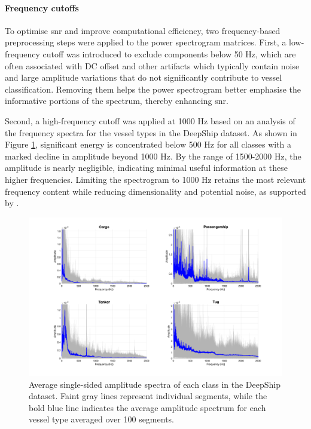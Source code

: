 \paragraph{Frequency cutoffs}
To optimise \acrshort{snr} and improve computational efficiency, two frequency-based preprocessing steps were applied to the power spectrogram matrices. First, a low-frequency cutoff was introduced to exclude components below 50 Hz, which are often associated with DC offset and other artifacts which typically contain noise and large amplitude variations that do not significantly contribute to vessel classification. Removing them helps the power spectrogram better emphasise the informative portions of the spectrum, thereby enhancing \acrshort{snr}.

Second, a high-frequency cutoff was applied at 1000 Hz based on an analysis of the frequency spectra for the vessel types in the DeepShip dataset. As shown in Figure \ref{fig:freq-ampl-highf}, significant energy is concentrated below 500 Hz for all classes with a marked decline in amplitude beyond 1000 Hz. By the range of 1500-2000 Hz, the amplitude is nearly negligible, indicating minimal useful information at these higher frequencies. Limiting the spectrogram to 1000 Hz retains the most relevant frequency content while reducing dimensionality and potential noise, as supported by \cite{premus_machine_2020}.

\begin{figure}[tbp]
    \centering
    \includegraphics[trim={3.5cm 1cm 2.5cm 1cm},clip,width=\textwidth]{img/ch3/freq_ampl/average_spectra_all.pdf}
    \caption{Average single-sided amplitude spectra of each class in the DeepShip dataset. Faint gray lines represent individual segments, while the bold blue line indicates the average amplitude spectrum for each vessel type averaged over 100 segments.}
    \label{fig:freq-ampl-highf}
\end{figure}

